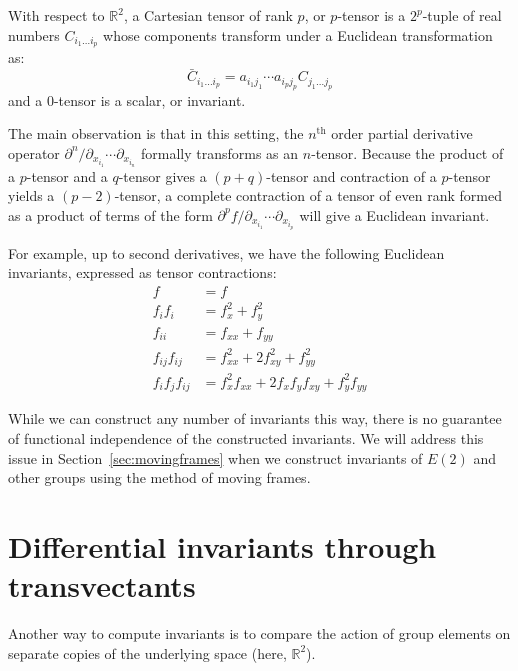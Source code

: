 \documentclass[review,onefignum,onetabnum]{siamonline190516}
\begin{document}
{With respect to $\mathbb{R}^2$, a Cartesian tensor of rank $p$, or $p$-tensor is a $2^p$-tuple of real numbers $C_{i_1\ldots i_p}$ whose components transform under a Euclidean transformation as:
\begin{equation*}
  \bar{C}_{i_1\ldots i_p} = a_{i_1j_1}\cdots a_{i_pj_p} C_{j_1\ldots j_p}
\end{equation*}
and a $0$-tensor is a scalar, or invariant. 

The main observation is that in this setting, the $n^\text{th}$ order partial derivative operator $\partial^n / \partial_{x_{i_1}}\cdots \partial_{x_{i_n}}$ formally transforms as an $n$-tensor.  Because the product of a $p$-tensor and a $q$-tensor gives a $(p+q)$-tensor and contraction of a $p$-tensor yields a $(p-2)$-tensor, a complete contraction of a tensor of even rank formed as a product of terms of the form $\partial^p f / \partial_{x_{i_1}} \cdots \partial_{x_{i_p}}$ will give a Euclidean invariant.

For example, up to second derivatives, we have the following Euclidean invariants, expressed as tensor contractions:
\begin{align*}
  f &= f \\
  f_if_i &= f_x^2 + f_y^2 \\
  f_{ii} &= f_{xx} + f_{yy} \\
  f_{ij} f_{ij} &= f_{xx}^2 + 2f_{xy}^2 + f_{yy}^2 \\
  f_i f_j f_{ij} &= f_x^2 f_{xx} + 2f_x f_y f_{xy} + f_y^2 f_{yy}
\label{eq:se2}
\end{align*}

While we can construct any number of invariants this way, there is no guarantee of functional independence of the constructed invariants. We will address this issue in Section~\ref{sec:movingframes} when we construct invariants of $E(2)$ and other groups using the method of moving frames.


\section{Differential invariants through transvectants}

Another way to compute invariants is to compare the action of group elements on separate copies of the underlying space (here, $\mathbb{R}^2$).

}
\end{document}
